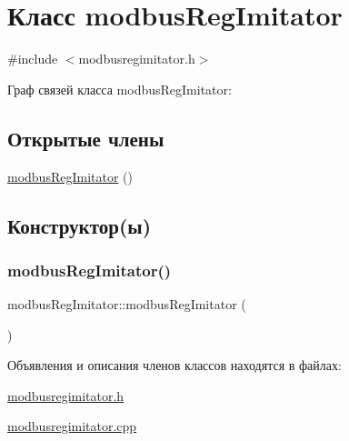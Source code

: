 \hypertarget{classmodbus_reg_imitator}{}\section{Класс modbus\+Reg\+Imitator}
\label{classmodbus_reg_imitator}


{\ttfamily \#include $<$modbusregimitator.\+h$>$}



Граф связей класса modbus\+Reg\+Imitator\+:
\subsection*{Открытые члены}
\begin{DoxyCompactItemize}
\item 
\hyperlink{classmodbus_reg_imitator_a460719b94d2ea80d009963ad45ead995}{modbus\+Reg\+Imitator} ()
\end{DoxyCompactItemize}


\subsection{Конструктор(ы)}
\mbox{\label{classmodbus_reg_imitator_a460719b94d2ea80d009963ad45ead995}} 
\subsubsection{\texorpdfstring{modbus\+Reg\+Imitator()}{modbusRegImitator()}}
{\footnotesize\ttfamily modbus\+Reg\+Imitator\+::modbus\+Reg\+Imitator (\begin{DoxyParamCaption}{ }\end{DoxyParamCaption})}



Объявления и описания членов классов находятся в файлах\+:\begin{DoxyCompactItemize}
\item 
\hyperlink{modbusregimitator_8h}{modbusregimitator.\+h}\item 
\hyperlink{modbusregimitator_8cpp}{modbusregimitator.\+cpp}\end{DoxyCompactItemize}
